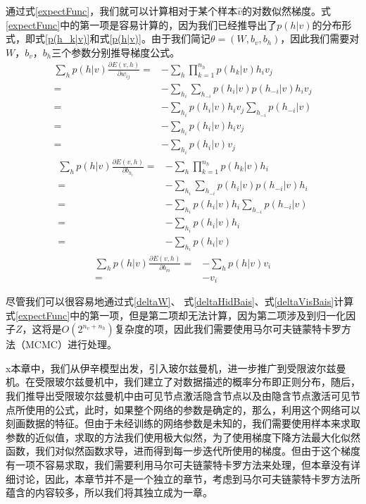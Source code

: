 通过式\eqref{expectFunc}，我们就可以计算相对于某个样本$\hat{v}$的对数似然梯度。式\eqref{expectFunc}中的第一项是容易计算的，因为我们已经推导出了$p(h|v)$的分布形式，即式\eqref{p(h_k|v)}和式\eqref{p(h|v)}。由于我们简记$\theta = (W, b_v, b_h)$，因此我们需要对$W$，$ b_v $，$ b_h $三个参数分别推导梯度公式。
\begin{equation}\label{deltaW}
\begin{split}
\sum\limits_h p(h|v)\frac{\partial E(v, h)}{\partial w_{ij}}
=&-\sum\limits_h \prod\limits_{k=1}^{n_h} p(h_k|v) h_i v_j \\
=&-\sum\limits_{h_i} \sum\limits_{h_{-i}} p(h_i|v)p(h_{-i}|v)h_i v_j \\
=& -\sum\limits_{h_i}  p(h_i|v)h_i v_j \sum\limits_{h_{-i}}p(h_{-i}|v) \\
=& -\sum\limits_{h_i}  p(h_i|v)h_i v_j \\
=& -\sum\limits_{h_i}  p(h_i|v)v_j
\end{split}
\end{equation}
\begin{equation}\label{deltaHidBais}
\begin{split}
\sum\limits_h p(h|v)\frac{\partial E(v, h)}{\partial b_{h_i}}
=&-\sum\limits_h \prod\limits_{k=1}^{n_h} p(h_k|v) h_i\\
=&-\sum\limits_{h_i} \sum\limits_{h_{-i}} p(h_i|v)p(h_{-i}|v)h_i\\
=& -\sum\limits_{h_i}  p(h_i|v)h_i\sum\limits_{h_{-i}}p(h_{-i}|v) \\
=& -\sum\limits_{h_i}  p(h_i|v)h_i\\
=& -\sum\limits_{h_i}  p(h_i|v)
\end{split}
\end{equation}
\begin{equation}\label{deltaVisBais}
\begin{split}
\sum\limits_h p(h|v)\frac{\partial E(v, h)}{\partial b_{vi}}
=& - \sum\limits_h p(h|v) v_i\\
=&- v_i
\end{split}
\end{equation}

尽管我们可以很容易地通过式\eqref{deltaW}、 式\eqref{deltaHidBais}、式\eqref{deltaVisBais}计算式\eqref{expectFunc}中的第一项，但是第二项却无法计算，因为第二项涉及到归一化因子$Z$，这将是$O(2^{n_v+n_h})$复杂度的项，因此我们需要使用马尔可夫链蒙特卡罗方法（MCMC）进行处理。

x本章中，我们从伊辛模型出发，引入玻尔兹曼机，进一步推广到受限波尔兹曼机。在受限玻尔兹曼机中，我们建立了对数据描述的概率分布即正则分布，随后，我们推导出受限玻尔兹曼机中由可见节点激活隐含节点以及由隐含节点激活可见节点所使用的公式，此时，如果整个网络的参数是确定的，那么，利用这个网络可以刻画数据的特征。但由于未经训练的网络参数是未知的，我们需要使用样本来求取参数的近似值，求取的方法我们使用极大似然，为了使用梯度下降方法最大化似然函数，我们对似然函数求导，进而得到每一步迭代所使用的梯度。但由于这个梯度有一项不容易求取，我们需要利用马尔可夫链蒙特卡罗方法来处理，但本章没有详细讨论，因此，本章节并不是一个独立的章节，考虑到马尔可夫链蒙特卡罗方法所蕴含的内容较多，所以我们将其独立成为一章。